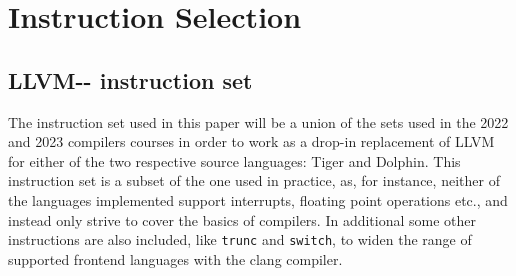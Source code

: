\documentclass{article}
\begin{document}


\section{Instruction Selection}



\subsection{LLVM-{}- instruction set}


The instruction set used in this paper will be a union of the sets used in the 2022 and 2023 compilers courses in order to work as a drop-in replacement of LLVM for either of the two respective source languages:  Tiger and Dolphin. This instruction set is a subset of the one used in practice, as, for instance, neither of the languages implemented support interrupts, floating point operations etc., and instead only strive to cover the basics of compilers. In additional some other instructions are also included, like \lstinline!trunc! and \lstinline!switch!, to widen the range of supported frontend languages with the clang compiler.
\end{document}
